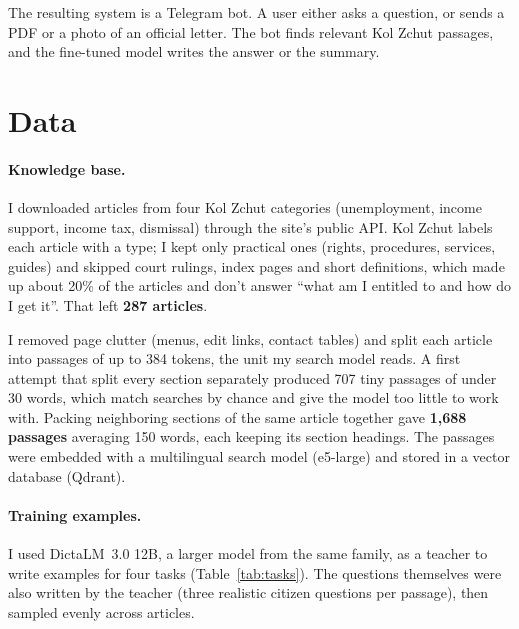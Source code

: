 \documentclass[11pt]{article}
\begin{document}
The resulting system is a Telegram bot. A user either asks a question, or sends a PDF or a photo of an official letter. The bot finds relevant Kol Zchut passages, and the fine-tuned model writes the answer or the summary.

\section{Data}

\paragraph{Knowledge base.} I downloaded articles from four Kol Zchut categories (unemployment, income support, income tax, dismissal) through the site's public API. Kol Zchut labels each article with a type; I kept only practical ones (rights, procedures, services, guides) and skipped court rulings, index pages and short definitions, which made up about 20\% of the articles and don't answer ``what am I entitled to and how do I get it''. That left \textbf{287 articles}.

I removed page clutter (menus, edit links, contact tables) and split each article into passages of up to 384 tokens, the unit my search model reads. A first attempt that split every section separately produced 707 tiny passages of under 30 words, which match searches by chance and give the model too little to work with. Packing neighboring sections of the same article together gave \textbf{1,688 passages} averaging 150 words, each keeping its section headings. The passages were embedded with a multilingual search model (e5-large) and stored in a vector database (Qdrant).

\paragraph{Training examples.} I used DictaLM~3.0 12B, a larger model from the same family, as a teacher to write examples for four tasks (Table~\ref{tab:tasks}). The questions themselves were also written by the teacher (three realistic citizen questions per passage), then sampled evenly across articles.
\end{document}
